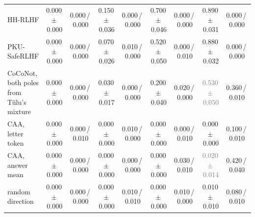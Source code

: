 \begin{tabular}{@{}lcccccccc@{}}
HH-RLHF & 0.000\,{\scriptsize$\pm$\,0.000} & {\scriptsize 0.000\,/\,0.000} & 0.150\,{\scriptsize$\pm$\,0.036} & {\scriptsize 0.000\,/\,0.000} & 0.700\,{\scriptsize$\pm$\,0.046} & {\scriptsize 0.000\,/\,0.000} & 0.890\,{\scriptsize$\pm$\,0.031} & {\scriptsize 0.000\,/\,0.000} \\
PKU-SafeRLHF & 0.000\,{\scriptsize$\pm$\,0.000} & {\scriptsize 0.000\,/\,0.000} & 0.070\,{\scriptsize$\pm$\,0.026} & {\scriptsize 0.010\,/\,0.000} & 0.520\,{\scriptsize$\pm$\,0.050} & {\scriptsize 0.000\,/\,0.010} & 0.880\,{\scriptsize$\pm$\,0.032} & {\scriptsize 0.000\,/\,0.000} \\
CoCoNot, both poles from T\"ulu's mixture & 0.000\,{\scriptsize$\pm$\,0.000} & {\scriptsize 0.000\,/\,0.000} & 0.030\,{\scriptsize$\pm$\,0.017} & {\scriptsize 0.000\,/\,0.000} & 0.200\,{\scriptsize$\pm$\,0.040} & {\scriptsize 0.020\,/\,0.000} & \textcolor{gray}{0.530\,{\scriptsize$\pm$\,0.050}} & {\scriptsize 0.360\,/\,0.010} \\
CAA, letter token & 0.000\,{\scriptsize$\pm$\,0.000} & {\scriptsize 0.000\,/\,0.010} & 0.000\,{\scriptsize$\pm$\,0.000} & {\scriptsize 0.010\,/\,0.000} & 0.000\,{\scriptsize$\pm$\,0.000} & {\scriptsize 0.000\,/\,0.010} & 0.000\,{\scriptsize$\pm$\,0.000} & {\scriptsize 0.100\,/\,0.010} \\
CAA, answer mean & 0.000\,{\scriptsize$\pm$\,0.000} & {\scriptsize 0.000\,/\,0.000} & 0.000\,{\scriptsize$\pm$\,0.000} & {\scriptsize 0.000\,/\,0.000} & 0.000\,{\scriptsize$\pm$\,0.000} & {\scriptsize 0.030\,/\,0.010} & \textcolor{gray}{0.020\,{\scriptsize$\pm$\,0.014}} & {\scriptsize 0.420\,/\,0.040} \\
random direction & 0.000\,{\scriptsize$\pm$\,0.000} & {\scriptsize 0.000\,/\,0.000} & 0.000\,{\scriptsize$\pm$\,0.000} & {\scriptsize 0.010\,/\,0.010} & 0.000\,{\scriptsize$\pm$\,0.000} & {\scriptsize 0.010\,/\,0.000} & 0.010\,{\scriptsize$\pm$\,0.010} & {\scriptsize 0.080\,/\,0.010} \\
\bottomrule
\end{tabular}
